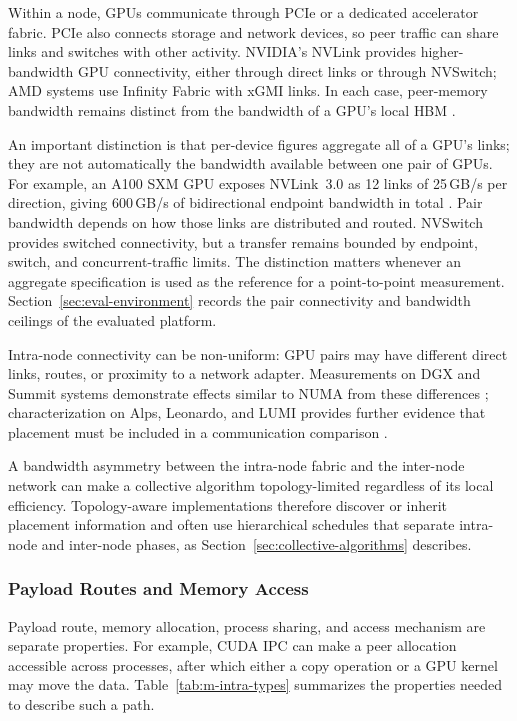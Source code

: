 Within a node, GPUs communicate through \ac{PCIe} or a dedicated accelerator fabric. PCIe also connects storage and network devices, so peer traffic can share links and switches with other activity. NVIDIA's NVLink provides higher-bandwidth GPU connectivity, either through direct links or through NVSwitch; AMD systems use Infinity Fabric with \ac{xGMI} links. In each case, peer-memory bandwidth remains distinct from the bandwidth of a GPU's local \ac{HBM} \cite{song_survey_2025}.

An important distinction is that per-device figures aggregate all of a GPU's links; they are not automatically the bandwidth available between one pair of GPUs. For example, an A100 SXM GPU exposes NVLink~3.0 as 12 links of 25\,GB/s per direction, giving 600\,GB/s of bidirectional endpoint bandwidth in total \cite{song_survey_2025}. Pair bandwidth depends on how those links are distributed and routed. NVSwitch provides switched connectivity, but a transfer remains bounded by endpoint, switch, and concurrent-traffic limits. The distinction matters whenever an aggregate specification is used as the reference for a point-to-point measurement. Section~\ref{sec:eval-environment} records the pair connectivity and bandwidth ceilings of the evaluated platform.

Intra-node connectivity can be non-uniform: GPU pairs may have different direct links, routes, or proximity to a network adapter. Measurements on DGX and Summit systems demonstrate effects similar to \ac{NUMA} from these differences \cite{li_evaluating_2020}; characterization on Alps, Leonardo, and LUMI provides further evidence that placement must be included in a communication comparison \cite{desensi_exploring_2024}.

A bandwidth asymmetry between the intra-node fabric and the inter-node network can make a collective algorithm topology-limited regardless of its local efficiency. Topology-aware implementations therefore discover or inherit placement information and often use hierarchical schedules that separate intra-node and inter-node phases, as Section~\ref{sec:collective-algorithms} describes.

\subsubsection{Payload Routes and Memory Access}

Payload route, memory allocation, process sharing, and access mechanism are separate properties. For example, CUDA IPC can make a peer allocation accessible across processes, after which either a copy operation or a GPU kernel may move the data. Table~\ref{tab:m-intra-types} summarizes the properties needed to describe such a path.

